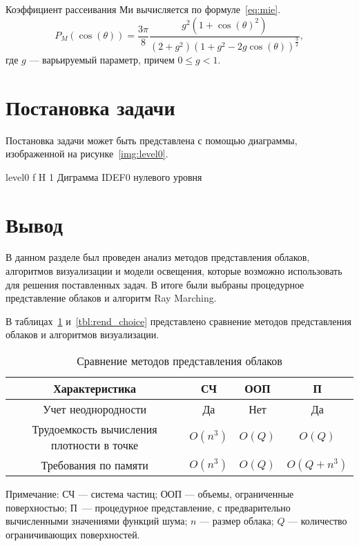 Коэффициент рассеивания Ми вычисляется по формуле~\eqref{eq:mie}.
\begin{equation}
	\label{eq:mie}
	P_M(\cos(\theta)) = \frac{3\pi}{8}\frac{g^2 (1 + \cos(\theta)^2)}{(2 + g^2)(1+ g^2 - 2g \cos(\theta))^{\frac{3}{2}}},
\end{equation}
где $ g $ --- варьируемый параметр, причем $ 0 \leq g < 1 $.

\section{Постановка задачи}

Постановка задачи может быть представлена с помощью диаграммы, изображенной на рисунке~\ref{img:level0}.

{level0} %
{f} %
{H} %
{1\textwidth} %
{Диграмма IDEF0 нулевого уровня} %



\section*{Вывод}

В данном разделе был проведен анализ методов представления облаков, алгоритмов визуализации и модели освещения, которые возможно использовать для решения поставленных задач. В итоге были выбраны процедурное представление облаков и алгоритм Ray Marching.

В таблицах~\ref{tbl:repr_choice} и~\ref{tbl:rend_choice} представлено сравнение методов представления облаков и алгоритмов визуализации.

\begin{table}[H]
	\begin{center}
		\begin{threeparttable}
			\captionsetup{justification=raggedright,singlelinecheck=off}
			\caption{Сравнение методов представления облаков}
			\label{tbl:repr_choice}
			\begin{tabular}{|c|c|c|c|}
				\hline
				Характеристика &  СЧ  & ООП & П \\
				\hline
				Учет неоднородности &  Да  & Нет & Да \\
				\hline
				Трудоемкость вычисления плотности в точке &  $O(n^3)$ & $O(Q)$ & $O(Q)$ \\
				\hline
				Требования по памяти &  $O(n^3)$ & $O(Q)$ & $O(Q + n^3)$ \\
				\hline
			\end{tabular}
			\begin{tablenotes}
				\small
				\item Примечание: СЧ --- система частиц; ООП --- объемы, ограниченные поверхностью; П~--- процедурное представление, с предварительно вычисленными значениями функций шума; $n$ --- размер облака; $Q$ --- количество ограничивающих поверхностей.
			\end{tablenotes}
		\end{threeparttable}
	\end{center}
\end{table}

